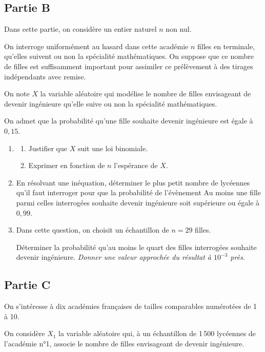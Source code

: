 \documentclass[10pt]{article}
\begin{document}
\subsection*{Partie B}

Dans cette partie, on considère un entier naturel $n$ non nul.

 On interroge uniformément au hasard dans cette académie $n$ filles en terminale, qu'elles suivent ou non la spécialité mathématiques. On suppose que ce nombre de filles est suffisamment important pour assimiler ce prélèvement à des tirages indépendants avec remise.

On note $X$ la variable aléatoire qui modélise le nombre de filles envisageant de devenir ingénieure qu'elle suive ou non la spécialité mathématiques.

On admet que la probabilité qu'une fille souhaite devenir ingénieure est égale à $0{,}15$.

\medskip

\begin{enumerate}
\item[1.] 
	\begin{enumerate}[label=\alph*.]
		\item Justifier que $X$ suit une loi binomiale.
		\item Exprimer en fonction de $n$ l'espérance de $X$.
	\end{enumerate}
\item[2.] En résolvant une inéquation, déterminer le plus petit nombre de lycéennes qu'il faut interroger pour que la probabilité de l'évènement \og Au moins une fille parmi celles interrogées souhaite devenir ingénieure \fg soit supérieure ou égale à $0{,}99$.
\item[3.] Dans cette question, on choisit un échantillon de $n = 29$ filles.

Déterminer la probabilité qu'au moins le quart des filles interrogées souhaite devenir ingénieure. \textit{Donner une valeur approchée du résultat à $10^{-3}$ près.}
\end{enumerate}

\subsection*{Partie C}

On s'intéresse à dix académies françaises de tailles comparables numérotées de 1 à 10.

On considère $X_1$ la variable aléatoire qui, à un échantillon de 1\,500 lycéennes de l'académie n°1, associe le nombre de filles envisageant de devenir ingénieure.
\end{document}
